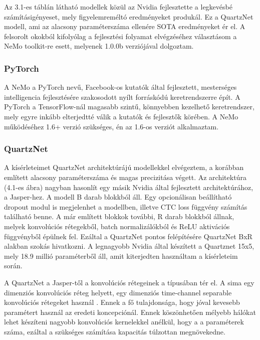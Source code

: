 Az 3.1-es táblán látható modellek közül az Nvidia fejlesztette a legkevésbé számításigényeset, mely figyelemreméltó eredményeket produkál. Ez a QuartzNet modell, ami az alacsony paraméterszáma ellenére SOTA eredményeket ér el. A felsorolt okokból kifolyólag a fejlesztési folyamat elvégzéséhez választásom a NeMo toolkit-re esett, melyenek 1.0.0b verziójával dolgoztam.

\subsubsection{PyTorch}

A NeMo a PyTorch nevű, Facebook-os kutatók által fejlesztett, mesterséges intelligencia fejlesztésére szakosodott nyílt forráskódú keretrendszerre épít. A PyTorch a TensorFlow-nál magasabb szintű, könnyebben kezelhető keretrendszer, mely egyre inkább elterjedtté válik a kutatók és fejlesztők körében. A NeMo működéséhez 1.6+ verzió szükséges, én az 1.6-os verziót alkalmaztam.

\subsubsection{QuartzNet}

A kísérleteimet QuartzNet architektúrájú modellekkel elvégeztem, a korábban említett alacsony paraméterszáma és magas precizitása végett. Az architektúra (4.1-es ábra) nagyban hasonlít egy másik Nvidia által fejlesztett architektúrához, a Jasper-hez. A modell B darab blokkból áll. Egy opcionálisan beállítható dropout modul is megjelenhet a modellben, illetve CTC loss függvény számítás található benne. A már említett blokkok további, R darab blokkból állnak, melyek konvolúciós rétegekből, batch normalizálókból és ReLU aktivációs függvényből épülnek fel. Ezáltal a QuartzNet pontos felépítésére QuartzNet BxR alakban szokás hivatkozni. A legnagyobb Nvidia által készített a Quartznet 15x5, mely 18.9 millió paraméterből áll, amit kiterjedten használtam a  kísérleteim során.

A QuartzNet a Jasper-től a konvolúciós rétegeinek a típusában tér el. A sima egy dimenziós konvolúciós réteg helyett, egy dimenziós time-channel separable konvolúciós rétegeket használ \cite{quartznet}. Ennek a fő tulajdonsága, hogy jóval kevesebb paramétert használ az eredeti koncepciónál. Ennek köszönhetően mélyebb hálókat lehet készíteni nagyobb konvolúciós kernelekkel anélkül, hogy a a paraméterek száma, ezáltal a szükséges számítása kapacitás túlzottan megnövekedne.

